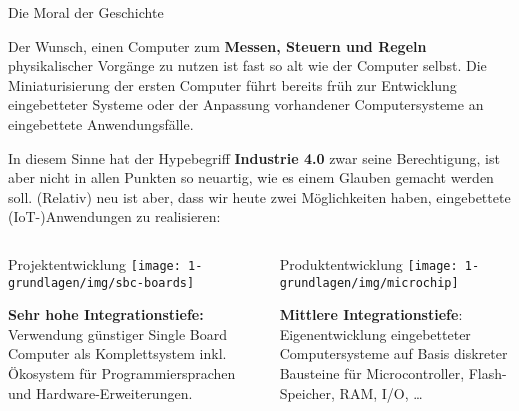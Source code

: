 \begin{frame}{Die Moral der Geschichte}
    \parbox{\linewidth}{
        \footnotesize

        Der Wunsch, einen Computer zum \textbf{Messen, Steuern und Regeln}
        physikalischer Vorgänge zu nutzen ist fast so alt wie der Computer
        selbst. Die Miniaturisierung der ersten Computer führt bereits früh
        zur Entwicklung eingebetteter Systeme oder der Anpassung vorhandener
        Computersysteme an eingebettete Anwendungsfälle.

        \medskip

        In diesem Sinne hat der Hypebegriff \textbf{\glqq{}Industrie 4.0\grqq{}}
        zwar seine Berechtigung, ist aber nicht in allen Punkten so neuartig,
        wie es einem Glauben gemacht werden soll. (Relativ) neu ist aber, dass
        wir heute zwei Möglichkeiten haben, eingebettete (IoT-)Anwendungen zu
        realisieren:
    }

    \bigskip

    \begin{columns}
        \begin{column}[b]{.5\textwidth}
            \begin{block}{Projektentwicklung}
                \medskip
                    \texttt{[image: 1-grundlagen/img/sbc-boards]}

                \medskip
                \parbox{\linewidth}{
                    \footnotesize
                    \textbf{Sehr hohe Integrationstiefe:}
                    Verwendung günstiger Single Board Computer als Komplettsystem
                    inkl. Ökosystem für Programmiersprachen und Hardware-Erweiterungen.
                }
            \end{block}
        \end{column}

        \begin{column}[b]{.5\textwidth}
            \begin{block}{Produktentwicklung}
                \medskip
                    \texttt{[image: 1-grundlagen/img/microchip]}

                \medskip

                \parbox{\linewidth}{
                \footnotesize
                    \textbf{Mittlere Integrationstiefe}:
                    Eigenentwicklung eingebetteter Computersysteme auf Basis diskreter
                    Bausteine für Microcontroller, Flash-Speicher, RAM, I/O, …
                }
            \end{block}
        \end{column}
    \end{columns}
\end{frame}


